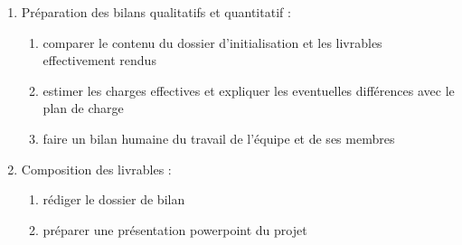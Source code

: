 \begin{enumerate}
          \begin{enumerate}
            \item Préparation des bilans qualitatifs et quantitatif : 
                \begin{enumerate}
                  \item comparer le contenu du dossier d'initialisation et les livrables effectivement rendus
                  \item estimer les charges effectives et expliquer les eventuelles différences avec le plan de charge
                  \item faire un bilan humaine du travail de l'équipe et de ses membres
                \end{enumerate}
            \item Composition des livrables : 
                \begin{enumerate}
                  \item rédiger le dossier de bilan
                  \item préparer une présentation powerpoint du projet
                \end{enumerate}
          \end{enumerate}

\end{enumerate}
